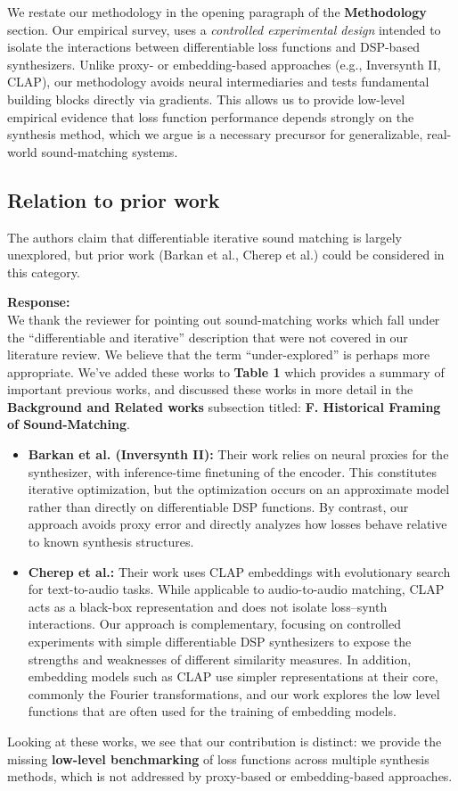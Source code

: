 \documentclass[11pt]{article}
\begin{document}
\medskip
\noindent We restate our methodology in the opening paragraph of the \textbf{Methodology} section. Our empirical survey, uses a \emph{controlled experimental design} intended to isolate the interactions between differentiable loss functions and DSP-based synthesizers. Unlike proxy- or embedding-based approaches (e.g., Inversynth II, CLAP), our methodology avoids neural intermediaries and tests fundamental building blocks directly via gradients. This allows us to provide low-level empirical evidence that loss function performance depends strongly on the synthesis method, which we argue is a necessary precursor for generalizable, real-world sound-matching systems.

\subsection*{Relation to prior work}
\noindent The authors claim that differentiable iterative sound matching is largely unexplored, but prior work (Barkan et al., Cherep et al.) could be considered in this category.  

\noindent\textbf{Response:} \\
We thank the reviewer for pointing out sound-matching works which fall under the ``differentiable and iterative'' description that were not covered in our literature review. We believe that the term ``under-explored'' is perhaps more appropriate. We've added these works to \textbf{Table 1} which provides a summary of important previous works, and discussed these works in more detail in the \textbf{Background and Related works} subsection titled: \textbf{F. Historical Framing of Sound-Matching}. 
\begin{itemize}
  \item \textbf{Barkan et al. (Inversynth II):} Their work relies on neural proxies for the synthesizer, with inference-time finetuning of the encoder. This constitutes iterative optimization, but the optimization occurs on an approximate model rather than directly on differentiable DSP functions. By contrast, our approach avoids proxy error and directly analyzes how losses behave relative to known synthesis structures.  
  \item \textbf{Cherep et al.:} Their work uses CLAP embeddings with evolutionary search for text-to-audio tasks. While applicable to audio-to-audio matching, CLAP acts as a black-box representation and does not isolate loss--synth interactions. Our approach is complementary, focusing on controlled experiments with simple differentiable DSP synthesizers to expose the strengths and weaknesses of different similarity measures.  In addition, embedding models such as CLAP use simpler representations at their core, commonly the Fourier transformations, and our work explores the low level functions that are often used for the training of embedding models.
\end{itemize}
Looking at these works, we see that our contribution is distinct: we provide the missing \textbf{low-level benchmarking} of loss functions across multiple synthesis methods, which is not addressed by proxy-based or embedding-based approaches.
\end{document}
